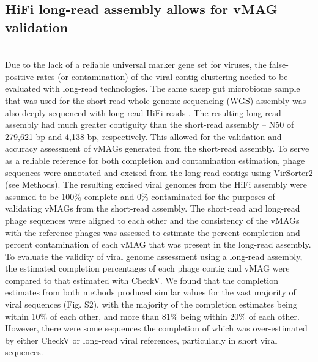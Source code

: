 \subsection*{HiFi long-read assembly allows for vMAG validation} \hfill\\
	Due to the lack of a reliable universal marker gene set for viruses, the false-positive rates (or contamination) of the viral contig clustering needed to be evaluated with long-read technologies. The same sheep gut microbiome sample that was used for the short-read whole-genome sequencing (WGS) assembly was also deeply sequenced with long-read HiFi reads \cite{RN15}. The resulting long-read assembly had much greater contiguity than the short-read assembly – N50 of 279,621 bp and 4,138 bp, respectively. This allowed for the validation and accuracy assessment of vMAGs generated from the short-read assembly. To serve as a reliable reference for both completion and contamination estimation, phage sequences were annotated and excised from the long-read contigs using VirSorter2 (see Methods). The resulting excised viral genomes from the HiFi assembly were assumed to be 100\% complete and 0\% contaminated for the purposes of validating vMAGs from the short-read assembly. The short-read and long-read phage sequences were aligned to each other and the consistency of the vMAGs with the reference phages was assessed to estimate the percent completion and percent contamination of each vMAG that was present in the long-read assembly. To evaluate the validity of viral genome assessment using a long-read assembly, the estimated completion percentages of each phage contig and vMAG were compared to that estimated with CheckV. We found that the completion estimates from both methods produced similar values for the vast majority of viral sequences (Fig. S2), with the majority of the completion estimates being within 10\% of each other, and more than 81\% being within 20\% of each other. However, there were some sequences the completion of which was over-estimated by either CheckV or long-read viral references, particularly in short viral sequences.


